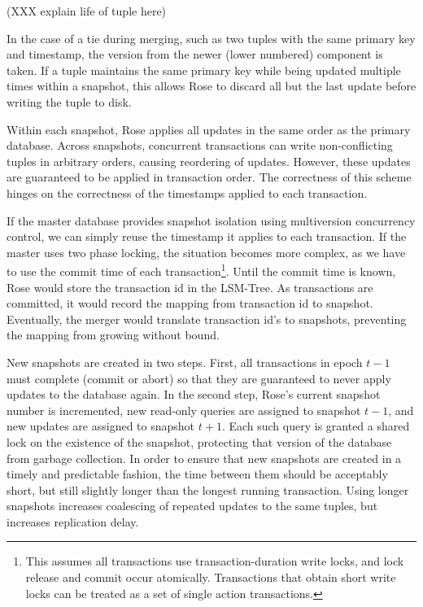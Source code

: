 \documentclass{vldb}
\newcommand{\rows}{Rose\xspace}
\newcommand{\rowss}{Rose's\xspace}
\begin{document}
(XXX explain life of tuple here)

In the case of a tie
during merging, such as two tuples with the same primary key and
timestamp, the version from the newer (lower numbered) component is
taken.  If a tuple maintains the same primary key while being updated
multiple times within a snapshot, this allows \rows to discard all but
the last update before writing the tuple to disk.

Within each snapshot, \rows applies all updates in the
same order as the primary database.  Across snapshots, concurrent
transactions can write non-conflicting tuples in arbitrary
orders, causing reordering of updates.  However, these updates are
guaranteed to be applied in transaction order.  The correctness of
this scheme hinges on the correctness of the timestamps applied to
each transaction.

If the master database provides snapshot isolation using multiversion
concurrency control, we can
simply reuse the timestamp it applies to each transaction.  If the
master uses two phase locking, the situation becomes more complex, as
we have to use the commit time of each transaction\footnote{This assumes
  all transactions use transaction-duration write locks, and lock
  release and commit occur atomically.  Transactions that obtain short
  write locks can be treated as a set of single action transactions.}.
Until the commit time is known, \rows would store the transaction id in the
LSM-Tree.  As transactions are committed, it would record the mapping from
transaction id to snapshot.  Eventually, the merger would translate
transaction id's to snapshots, preventing the mapping from growing
without bound.

New snapshots are created in two steps.  First, all transactions in
epoch $t-1$ must complete (commit or abort) so that they are
guaranteed to never apply updates to the database again.  In the
second step, \rowss current snapshot number is incremented, new
read-only queries are assigned to snapshot $t-1$, and new updates
are assigned to snapshot $t+1$.  Each such query is granted a
shared lock on the existence of the snapshot, protecting that version
of the database from garbage collection.  In order to ensure that new
snapshots are created in a timely and predictable fashion, the time
between them should be acceptably short, but still slightly longer
than the longest running transaction.  Using longer snapshots
increases coalescing of repeated updates to the same tuples,
but increases replication delay.
\end{document}
